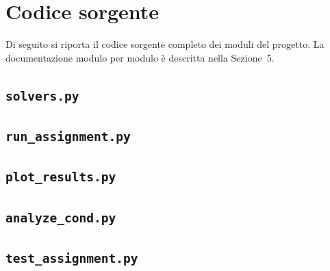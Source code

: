 \documentclass[11pt,a4paper]{article}
\begin{document}
\appendix
\section{Codice sorgente}
Di seguito si riporta il codice sorgente completo dei moduli del progetto. La
documentazione modulo per modulo è descritta nella Sezione~5.

\subsection{\texttt{solvers.py}}


\subsection{\texttt{run\_assignment.py}}


\subsection{\texttt{plot\_results.py}}


\subsection{\texttt{analyze\_cond.py}}


\subsection{\texttt{test\_assignment.py}}

\end{document}
